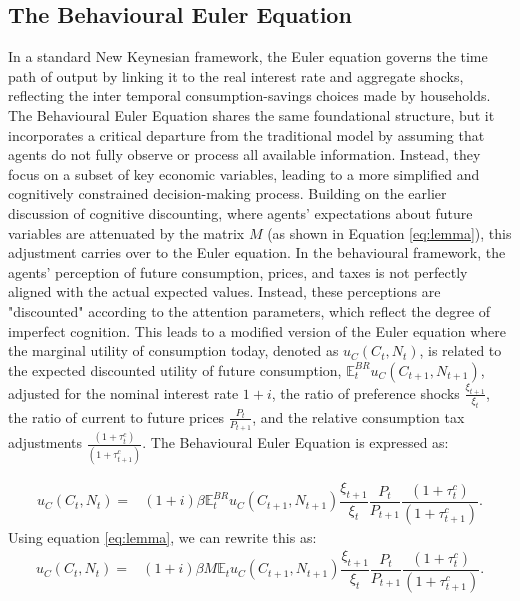 \documentclass[11pt]{article}
\newcommand{\bb}{\bigbreak\noindent}
\begin{document}
\begin{spacing}{2}
\subsection{The Behavioural Euler Equation}
In a standard New Keynesian framework, the Euler equation governs the time path of output by linking it to the real interest rate and aggregate shocks, reflecting the inter temporal consumption-savings choices made by households. The Behavioural Euler Equation shares the same foundational structure, but it incorporates a critical departure from the traditional model by assuming that agents do not fully observe or process all available information. Instead, they focus on a subset of key economic variables, leading to a more simplified and cognitively constrained decision-making process.
\bb
Building on the earlier discussion of cognitive discounting, where agents' expectations about future variables are attenuated by the matrix \( M \) (as shown in Equation \ref{eq:lemma}), this adjustment carries over to the Euler equation. In the behavioural framework, the agents' perception of future consumption, prices, and taxes is not perfectly aligned with the actual expected values. Instead, these perceptions are "discounted" according to the attention parameters, which reflect the degree of imperfect cognition.
\bb
This leads to a modified version of the Euler equation where the marginal utility of consumption today, denoted as \( u_C(C_t, N_t) \), is related to the expected discounted utility of future consumption, \( \mathbb{E}_t^{BR} u_C(C_{t+1}, N_{t+1}) \), adjusted for the nominal interest rate \( 1+i \), the ratio of preference shocks \( \frac{\xi_{t+1}}{\xi_t} \), the ratio of current to future prices \( \frac{P_t}{P_{t+1}} \), and the relative consumption tax adjustments \( \frac{(1+\tau_t^c)}{(1+\tau_{t+1}^c)} \). The Behavioural Euler Equation is expressed as:

\begin{align}
	\label{eq: intertemporal_BR}
		u_C(C_t, N_t) =& (1+i) \beta \mathbb{E}_t^{BR} u_C(C_{t+1}, N_{t+1}) \dfrac{\xi_{t+1}}{\xi_t}\dfrac{P_t}{P_{t+1}} \dfrac{(1+\tau_{t}^c)}{(1+\tau_{t+1}^c)}.
\end{align}
Using equation \ref{eq:lemma}, we can rewrite this as:
\begin{align}
	\label{eq:euler_br}
	u_C(C_t, N_t) =& (1+i) \beta M \mathbb{E}_t u_C(C_{t+1}, N_{t+1}) \dfrac{\xi_{t+1}}{\xi_t}\dfrac{P_t}{P_{t+1}} \dfrac{(1+\tau_{t}^c)}{(1+\tau_{t+1}^c)}.
\end{align}


\end{spacing}
\end{document}
